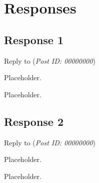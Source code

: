 
\newpage
\chapter{Responses}

  \section{Response 1}
    \begin{mdframed}[backgroundcolor=green!20]
      Reply to \textbf{} (\textit{Post ID: 00000000})

      Placeholder.
    \end{mdframed}
    Placeholder.


  \section{Response 2}
    \begin{mdframed}[backgroundcolor=green!20]
      Reply to \textbf{} (\textit{Post ID: 00000000})

      Placeholder.
    \end{mdframed}
    Placeholder.
